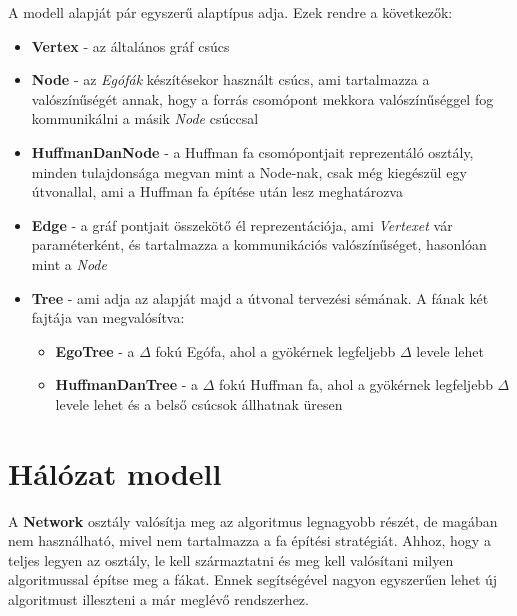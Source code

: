 \documentclass[12pt]{report}
\begin{document}
A modell alapját pár egyszerű alaptípus adja. Ezek rendre a következők:
\begin{itemize}
	\item \textbf{Vertex} - az általános gráf csúcs
	\item \textbf{Node} - az \textit{Egófák} készítésekor használt csúcs, ami tartalmazza a valószínűségét annak, hogy a forrás csomópont mekkora valószínűséggel fog kommunikálni a másik \textit{Node} csúccsal
	\item \textbf{HuffmanDanNode} - a Huffman fa csomópontjait reprezentáló osztály, minden tulajdonsága megvan mint a Node-nak, csak még kiegészül egy útvonallal, ami a Huffman fa építése után lesz meghatározva
	\item \textbf{Edge} - a gráf pontjait összekötő él reprezentációja, ami \textit{Vertexet} vár paraméterként, és tartalmazza a kommunikációs valószínűséget, hasonlóan mint a \textit{Node}
	\item \textbf{Tree} - ami adja az alapját majd a útvonal tervezési sémának. A fának két fajtája van megvalósítva:
	\begin{itemize}
		\item \textbf{EgoTree} - a $\Delta$ fokú Egófa, ahol a gyökérnek legfeljebb $\Delta$ levele lehet
		\item \textbf{HuffmanDanTree} - a $\Delta$ fokú Huffman fa, ahol a gyökérnek legfeljebb $\Delta$ levele lehet és a belső csúcsok állhatnak üresen
	\end{itemize}
	
	
\end{itemize}

\section{Hálózat modell}

A \textbf{Network} osztály valósítja meg az algoritmus legnagyobb részét, de magában nem használható, mivel nem tartalmazza a fa építési stratégiát.
Ahhoz, hogy a teljes legyen az osztály, le kell származtatni és meg kell valósítani milyen algoritmussal építse meg a fákat.
Ennek segítségével nagyon egyszerűen lehet új algoritmust illeszteni a már meglévő rendszerhez.
\end{document}

